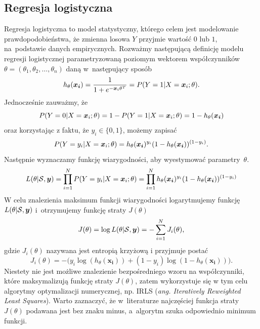 \documentclass[inzynierska]{pwr_wmat_praca_dyplomowa}
\theoremstyle{plain}
\numberwithin{theorem}{chapter}
\theoremstyle{definition}
\numberwithin{theorem}{chapter}
\begin{document}
\subsection{Regresja logistyczna}
\label{reg-log}
Regresja logistyczna to model statystyczny, którego celem jest modelowanie prawdopodobieństwa, że zmienna losowa $Y$ przyjmie wartość $0$ lub $1$, na~podstawie danych empirycznych. Rozważmy następującą definicję modelu regresji logistycznej parametryzowaną poziomym wektorem współczynników $\theta = (\theta_1, \theta_2, \dots, \theta_n)$ daną w~następujący sposób
\begin{equation}
	h_{\theta}(\boldsymbol{x_i}) = \frac{1}{1+e^{-\boldsymbol{x}_{i}\theta^T}} = P(Y = 1|X = \boldsymbol{x}_{i};\theta) \text{.}
\end{equation} 
Jednocześnie zauważmy, że
$$ P(Y = 0|X = \boldsymbol{x}_{i};\theta) = 1 - P(Y = 1|X = \boldsymbol{x}_{i};\theta) = 1 - h_{\theta}(\boldsymbol{x_i}) $$
oraz korzystając z faktu, że $y_i \in \{0,1\}$, możemy zapisać 
$$ P(Y = y_i|X = \boldsymbol{x}_{i};\theta) = h_{\theta}(\boldsymbol{x_i})^{y_i}(1-h_{\theta}(\boldsymbol{x_i}))^{(1-y_i)} \text{.}$$
Następnie wyznaczamy funkcję wiarygodności, aby wyestymować parametry~$\theta$.
$$ L(\theta | \mathcal{S}, \boldsymbol{y}) = \prod_{i=1}^N P(Y = y_i | X = \boldsymbol{x}_{i}; \theta) = \prod_{i=1}^N h_{\theta}(\boldsymbol{x_i})^{y_i}(1-h_{\theta}(\boldsymbol{x_i}))^{(1-y_i)}$$
W celu znalezienia maksimum funkcji wiarygodności logarytmujemy funkcję $L(\theta | \mathcal{S}, \boldsymbol{y})$ i~otrzymujemy funkcję straty $J(\theta)$
$$ J(\theta) = \log L(\theta | \mathcal{S}, \boldsymbol{y})  = -\sum_{i=1}^N J_i(\theta)\text{,}$$
gdzie $J_i(\theta)$ nazywana jest entropią krzyżową i przyjmuje postać
\begin{equation}
	\label{c-e}
	J_i(\theta) = -\big(y_i\log(h_{\theta}(\boldsymbol{x_i})) + (1-y_i)\log(1 - h_{\theta}(\boldsymbol{x_i}))\big) \text{.}
\end{equation}
Niestety nie jest możliwe znalezienie bezpośredniego wzoru na współczynniki, które maksymalizują funkcję straty $J(\theta)$, zatem wykorzystuje się w tym celu algorytmy optymalizacji numerycznej, np. IRLS (\textit{ang. Iteratively Reweighted Least Squares}). Warto zaznaczyć, że w~literaturze najczęściej funkcja straty $J(\theta)$ podawana jest bez znaku minus, a~algorytm szuka odpowiednio minimum funkcji.
\end{document}
